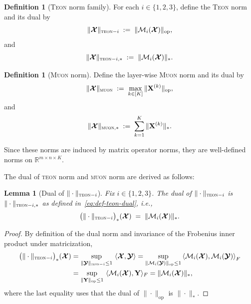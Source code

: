\documentclass{article}
\newcommand{\ten}[1]{\bm{\mathcal{#1}}}
\newcommand{\mat}[1]{\mathbf{#1}}
\theoremstyle{plain}
\newtheorem{lemma}[theorem]{Lemma}
\theoremstyle{definition}
\newtheorem{definition}[theorem]{Definition}
\theoremstyle{remark}
\begin{document}
\begin{definition}[\textsc{Teon} norm family]
\label{def:teon_norm_family}
For each $i\in\{1,2,3\}$, define the \textsc{Teon} norm and its dual by
\begin{equation}
\label{eq:def-teon-primal}
\|\ten{X}\|_{\textsc{teon}-i}
\;:=\;
\|\mathcal{M}_i(\ten{X})\|_{\mathrm{op}},
\end{equation}
and
\begin{equation}
\label{eq:def-teon-dual}
\|\ten{X}\|_{\textsc{teon}-i,*}
\;:=\;
\|\mathcal{M}_i(\ten{X})\|_{*}.
\end{equation}
\end{definition}

\begin{definition}[\textsc{Muon} norm]
\label{def:muon_norm}
Define the layer-wise \textsc{Muon} norm and its dual by
\begin{equation}
\label{eq:def-muon-primal}
\|\ten{X}\|_{\textsc{muon}}
\;:=\;
\max_{k\in[K]}\|\mat{X}^{(k)}\|_{\mathrm{op}},
\end{equation}
and
\begin{equation}
\label{eq:def-muon-dual}
\|\ten{X}\|_{\textsc{muon},*}
\;:=\;
\sum_{k=1}^K \|\mat{X}^{(k)}\|_{*}.
\end{equation}
\end{definition}

Since these norms are induced by matrix operator norms, they are well-defined norms on
$\mathbb{R}^{m\times n\times K}$.

The dual of \textsc{teon} norm and \textsc{muon} norm are derived as follows:

\begin{lemma}[Dual of $\|\cdot\|_{\textsc{teon}-i}$]
\label{lem:dual-teon}
Fix $i\in\{1,2,3\}$. The dual of $\|\cdot\|_{\textsc{teon}-i}$ is
$\|\cdot\|_{\textsc{teon}-i,*}$ as defined in~\eqref{eq:def-teon-dual}, i.e.,
\begin{equation}
\label{eq:dual-teon}
\big(\|\cdot\|_{\textsc{teon}-i}\big)_*(\ten{X})
\;=\;
\|\mathcal{M}_i(\ten{X})\|_*.
\end{equation}
\end{lemma}

\begin{proof}
By definition of the dual norm and invariance of the Frobenius inner product under matricization,
\begin{align}
\big(\|\cdot\|_{\textsc{teon}-i}\big)_*(\ten{X})
&=
\sup_{\|\ten{Y}\|_{\textsc{teon}-i}\le 1}\ \langle \ten{X},\ten{Y}\rangle
=
\sup_{\|\mathcal{M}_i(\ten{Y})\|_{\mathrm{op}}\le 1}
\left\langle \mathcal{M}_i(\ten{X}),\mathcal{M}_i(\ten{Y})\right\rangle_F
\nonumber\\
&=
\sup_{\|\mat{Y}\|_{\mathrm{op}}\le 1}\ \langle \mathcal{M}_i(\ten{X}),\mat{Y}\rangle_F
=
\|\mathcal{M}_i(\ten{X})\|_*,
\end{align}
where the last equality uses that the dual of $\|\cdot\|_{\mathrm{op}}$ is $\|\cdot\|_*$.
\end{proof}
\end{document}
